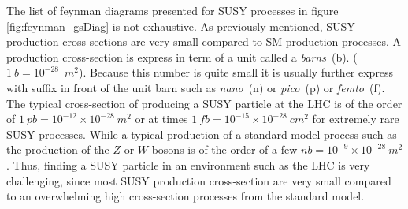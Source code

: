 {The list of feynman diagrams presented for SUSY processes in figure \ref{fig:feynman_gsDiag} is not exhaustive. As previously mentioned, SUSY production cross-sections are very small compared to SM production processes. A production cross-section is express in term of a unit called a \textit{barns}~(b). ($1~b = 10^{-28}$~$m^{2}$). Because this number is quite small it is usually further express with suffix in front of the unit barn such as \textit{nano}~(n) or \textit{pico}~(p) or \textit{femto}~(f). The typical cross-section of producing a SUSY particle at the LHC is of the order of $1~pb =10^{-12}\times 10^{-28}~m^{2}$ or at times $1~fb = 10^{-15}\times 10^{-28}~cm^{2}$ for extremely rare SUSY processes. While a typical production of a standard model process such as the production of the $Z$ or $W$ bosons is of the order of a few $nb = 10^{-9}\times 10^{-28}~m^{2}$. Thus, finding a SUSY particle in an environment such as the LHC is very challenging, since most SUSY production cross-section are very small compared to an overwhelming high cross-section processes from the standard model.
}
